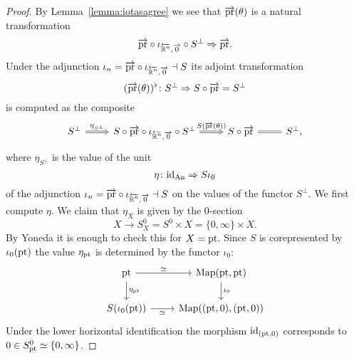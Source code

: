 \begin{proof}
    By Lemma~\ref{lemma:iotasagree} we see that $\overrightarrow{\mathrm{pr}}(\theta)$ is a natural transformation 
    \[
      \overrightarrow{\mathrm{pr}} \circ \iota_{\overleftarrow{\mathbb{R}^n},\overrightarrow{0}} \circ S^\perp \Rightarrow \overrightarrow{\mathrm{pr}}.  
    \]
    Under the adjunction $\iota_n = \overrightarrow{\mathrm{pr}} \circ \iota_{\overleftarrow{\mathbb{R}^n},\overrightarrow{0}} \dashv S$ its adjoint transformation 
    \[
    (\overrightarrow{\mathrm{pr}}(\theta))^\flat \colon S^\perp \Rightarrow S \circ \overrightarrow{\mathrm{pr}} = S^\perp   
    \]
    is computed as the composite
    \[\begin{tikzcd}
        {S^\perp} & {S\circ\overrightarrow{\pr} \circ \iotarnzero \circ S^\perp} & {S \circ \overrightarrow{\pr}} & {S^\perp}
        \arrow["{\eta_{S^\perp}}", Rightarrow, from=1-1, to=1-2]
        \arrow["{S(\overrightarrow{\pr}(\theta))}", Rightarrow, from=1-2, to=1-3]
        \arrow[Rightarrow, no head, from=1-3, to=1-4],
    \end{tikzcd}\]
    where 
    $ \eta_{S^\perp}$ is the value of the unit    
    \[
        \eta \colon \mathrm{id}_{\operatorname{An}} \Rightarrow S\iota_0
    \]
    of the adjunction $\iota_n = \overrightarrow{\mathrm{pr}} \circ \iota_{\overleftarrow{\mathbb{R}^n},\overrightarrow{0}} \dashv S$
    on the values of the functor $S^\perp$.
    We first compute $\eta$.
    We claim that $\eta_X$ is given by the $0$-section 
    \[
    X \to S^0_X = S^0 \times X = \{0, \infty\} \times X. 
    \]
    By Yoneda it is enough to check this for $X = \mathrm{pt}$.
    Since $S$ is corepresented by $\iota_0(\mathrm{pt})$ the value $\eta_{\mathrm{pt}}$ is determined by the functor $\iota_0$:
    \[\begin{tikzcd}
        \pt & {\Map(\pt,\pt)} \\
        {S(\iota_0(\pt))} & {\Map((\pt,0),(\pt,0))}
        \arrow["{\iota_0}", from=1-2, to=2-2]
        \arrow["{\eta_\pt}", from=1-1, to=2-1]
        \arrow["\simeq", from=1-1, to=1-2]
        \arrow["\simeq"', from=2-1, to=2-2]
    \end{tikzcd}\]
    Under the lower horizontal identification the morphism $\mathrm{id}_{(\mathrm{pt},0)}$ corresponds to $0 \in S^0_{\mathrm{pt}} \simeq \{0,\infty\}$.


\end{proof}
